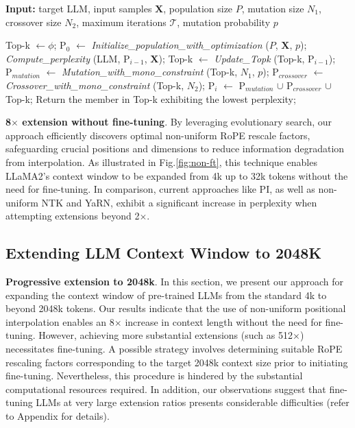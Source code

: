 \begin{algorithm}[t]
	\small
	\caption{The search algorithm}
	\textbf{Input:} target LLM, input samples $\mathbf{X}$, population size $P$, mutation size $N_1$, crossover size $N_2$, maximum iterations $\mathcal{T}$, mutation probability $p$\\

	\begin{algorithmic}[1]
		\label{alg:search}
		\STATE Top-k $\leftarrow \phi$;
		\STATE $\text{P}_0$ $\leftarrow$ \textit{Initialize\_population\_with\_optimization} ($P$, $\mathbf{X}$, $p$);
		\STATE \textit{Compute\_perplexity} (LLM, $\text{P}_{i-1}$, $\mathbf{X}$);
		\STATE Top-k $\leftarrow$ \textit{Update\_Topk} (Top-k, $\text{P}_{i-1}$);
		\STATE $\text{P}_{mutation}$ $\leftarrow$ \textit{Mutation\_with\_mono\_constraint} (Top-k, $N_1$, $p$);
		\STATE $\text{P}_{crossover}$ $\leftarrow$ \textit{Crossover\_with\_mono\_constraint} (Top-k, $N_2$);
		\STATE $\text{P}_i$ $\leftarrow$ $\text{P}_{mutation}$ $\cup$ $\text{P}_{crossover}$ $\cup$ Top-k;
		\ENDFOR
		\STATE Return the member in Top-k exhibiting the lowest perplexity;
	\end{algorithmic}
\end{algorithm}

\textbf{8$\times$ extension without fine-tuning}. By leveraging evolutionary search, our approach efficiently discovers optimal non-uniform RoPE rescale factors, safeguarding crucial positions and dimensions to reduce information degradation from interpolation. As illustrated in Fig.\ref{fig:non-ft}, this technique enables LLaMA2's context window to be expanded from 4k up to 32k tokens without the need for fine-tuning. In comparison, current approaches like PI, as well as non-uniform NTK and YaRN, exhibit a significant increase in perplexity when attempting extensions beyond 2$\times$.

\subsection{Extending LLM Context Window to 2048K}
\label{sec:extendto2048k}

\textbf{Progressive extension to 2048k}. In this section, we present our approach for expanding the context window of pre-trained LLMs from the standard 4k to beyond 2048k tokens. Our results indicate that the use of non-uniform positional interpolation enables an 8$\times$ increase in context length without the need for fine-tuning. However, achieving more substantial extensions (such as 512$\times$) necessitates fine-tuning. A possible strategy involves determining suitable RoPE rescaling factors corresponding to the target 2048k context size prior to initiating fine-tuning. Nevertheless, this procedure is hindered by the substantial computational resources required. In addition, our observations suggest that fine-tuning LLMs at very large extension ratios presents considerable difficulties (refer to Appendix for details).

